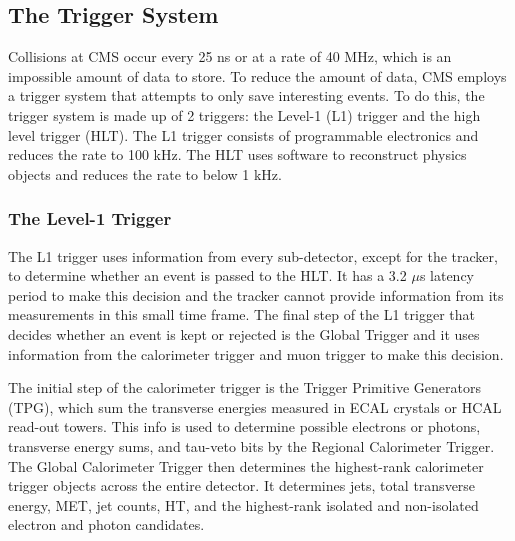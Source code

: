 

\subsection{The Trigger System}

Collisions at CMS occur every 25 ns or at a rate of 40 MHz, which is an impossible amount of data to store. To reduce the amount of data, CMS employs a trigger system that attempts to only save interesting events. To do this, the trigger system is made up of 2 triggers: the Level-1 (L1) trigger and the high level trigger (HLT). The L1 trigger consists of programmable electronics and reduces the rate to 100 kHz. The HLT uses software to reconstruct physics objects and reduces the rate to below 1 kHz. 

\subsubsection{The Level-1 Trigger}

The L1 trigger uses information from every sub-detector, except for the tracker, to determine whether an event is passed to the HLT. It has a 3.2 $\mu$s latency period to make this decision and the tracker cannot provide information from its measurements in this small time frame.  The final step of the L1 trigger that decides whether an event is kept or rejected is the Global Trigger and it uses information from the calorimeter trigger and muon trigger to make this decision.

The initial step of the calorimeter trigger is the Trigger Primitive Generators (TPG), which sum the transverse energies measured in ECAL crystals or HCAL read-out towers. This info is used to determine possible electrons or photons, transverse energy sums, and tau-veto bits by the Regional Calorimeter Trigger. The Global Calorimeter Trigger then determines the highest-rank calorimeter trigger objects across the entire detector. It determines jets, total transverse energy, MET, jet counts, HT, and the highest-rank isolated and non-isolated electron and photon candidates.


